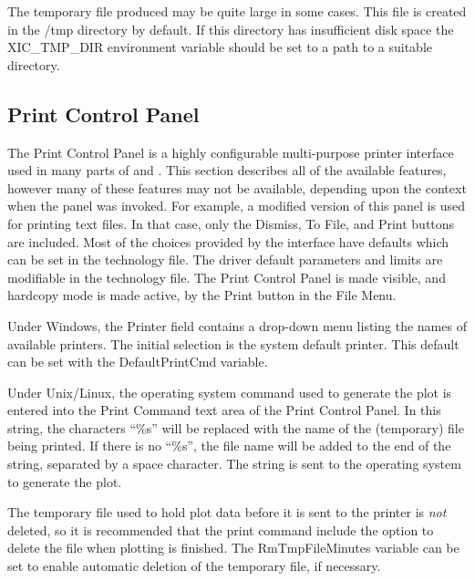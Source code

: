 The temporary file produced may be quite large in some cases.  This
file is created in the {\vt /tmp} directory by default.  If this
directory has insufficient disk space the {\et XIC\_TMP\_DIR}
environment variable should be set to a path to a suitable directory.


\subsection{Print Control Panel}

The {\cb Print Control Panel} is a highly configurable multi-purpose
printer interface used in many parts of {\Xic} and {\WRspice}.  This
section describes all of the available features, however many of these
features may not be available, depending upon the context when the
panel was invoked.  For example, a modified version of this panel is
used for printing text files.  In that case, only the {\cb Dismiss},
{\cb To File}, and {\cb Print} buttons are included.  Most of the
choices provided by the interface have defaults which can be set in
the technology file.  The driver default parameters and limits are
modifiable in the technology file.  The {\cb Print Control Panel} is
made visible, and hardcopy mode is made active, by the {\cb Print}
button in the {\cb File Menu}.

Under Windows, the {\cb Printer} field contains a drop-down menu
listing the names of available printers.  The initial selection is the
system default printer.  This default can be set with the {\et
DefaultPrintCmd} variable.

Under Unix/Linux, the operating system command used to generate the
plot is entered into the {\cb Print Command} text area of the {\cb
Print Control Panel}.  In this string, the characters ``{\vt \%s}''
will be replaced with the name of the (temporary) file being printed. 
If there is no ``{\vt \%s}'', the file name will be added to the end
of the string, separated by a space character.  The string is sent to
the operating system to generate the plot.

The temporary file used to hold plot data before it is sent to the
printer is {\it not\/} deleted, so it is recommended that the print
command include the option to delete the file when plotting is
finished.  The {\et RmTmpFileMinutes} variable can be set to enable
automatic deletion of the temporary file, if necessary.

